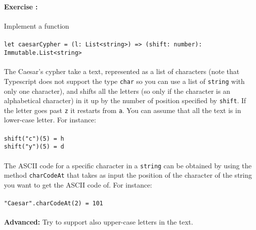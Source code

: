 \documentclass[]{article}
\newcounter{ExerciseCount}
\newcommand{\functionEx}[3]{
  Implement a function\\\\
   \texttt{let #1 = #2}\\\\ #3
}
\newcommand{\exercise}[1]{\noindent \textbf{Exercise \theExerciseCount:}\\\\ #1 \addtocounter{ExerciseCount}{1}
}
\begin{document}
\exercise{
  \functionEx{caesarCypher}{(l: List<string>) => (shift: number):\\ Immutable.List<string>}{
    The Caesar's cypher take a text, represented as a list of characters (note that Typescript does not support the type \texttt{char} so you can use a list of \texttt{string} with only one character), and shifts all the letters (so only if the character is an alphabetical character) in it up by the number of position specified by \texttt{shift}. If the letter goes past \texttt{z} it restarts from \texttt{a}. You can assume that all the text is in lower-case letter. For instance:\\\\    
    \texttt{shift("c")(5) = h}\\
    \texttt{shift("y")(5) = d}\\\\
    The ASCII code for a specific character in a \texttt{string} can be obtained by using the method \texttt{charCodeAt} that takes as input the position of the character of the string you want to get the ASCII code of. For instance:\\\\
    \texttt{"Caesar".charCodeAt(2) = 101}\\\\
    \textbf{Advanced: } Try to support also upper-case letters in the text.
  }
}\\
\end{document}
